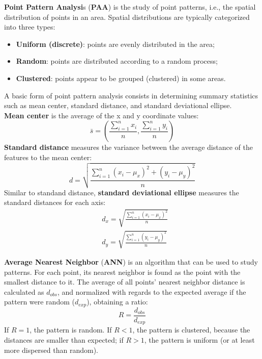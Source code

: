 \textbf{Point Pattern Analysi}s (\textbf{PAA}) is the study of point patterns, i.e., the spatial distribution of points in an area. Spatial distributions are typically categorized into three types:
\begin{itemize}
    \item \textbf{Uniform (discrete)}: points are evenly distributed in the area;
    \item \textbf{Random}: points are distributed according to a random process;
    \item \textbf{Clustered}: points appear to be grouped (clustered) in some areas.
\end{itemize}
A basic form of point pattern analysis consists in determining summary statistics such as mean center, standard distance, and standard deviational ellipse. \\
\textbf{Mean center} is the average of the x and y coordinate values:
\begin{equation*}
    \bar{s} = \left( \frac{\sum_{i=1}^n x_i}{n} , \frac{\sum_{i=1}^n y_i}{n} \right)
\end{equation*}
\textbf{Standard distance} measures the variance between the average distance of the features to the mean center:
\begin{equation*}
    d = \sqrt{\frac{\sum_{i=1}^n (x_i - \mu_x)^2 + (y_i - \mu_y)^2}{n}}
\end{equation*}
Similar to standand distance, \textbf{standard deviational ellipse} measures the standard distances for each axis:
\begin{align*}
    &d_x = \sqrt{\frac{\sum_{i=1}^n (x_i - \mu_x)^2}{n}} \\
    &d_y = \sqrt{\frac{\sum_{i=1}^n (y_i - \mu_y)^2}{n}}
\end{align*}

\textbf{Average Nearest Neighbor} (\textbf{ANN}) is an algorithm that can be used to study patterns. For each point, its nearest neighbor is found as the point with the smallest distance to it. The average of all points' nearest neighbor distance is calculated as $d_{obs}$, and normalized with regards to the expected average if the pattern were random ($d_{exp}$), obtaining a ratio:
\begin{equation*}
    R = \frac{d_{obs}}{d_{exp}}
\end{equation*}
If $R = 1$, the pattern is random. If $R < 1$, the pattern is clustered, because the distances are smaller than expected; if $R > 1$, the pattern is uniform (or at least more dispersed than random).

